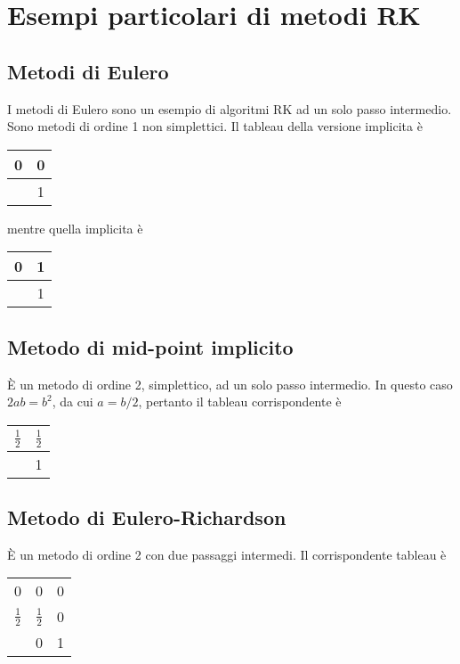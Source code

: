 \section{Esempi particolari di metodi RK}

\subsection{Metodi di Eulero}
I metodi di Eulero sono un esempio di algoritmi RK ad un solo passo intermedio. Sono metodi di ordine 1 non simplettici. Il tableau della versione implicita è
\begin{center}
\begin{tabular}{c|c}
0 & 0 \\
\midrule
 & 1 \\
\end{tabular}
\end{center}
mentre quella implicita è
\begin{center}
\begin{tabular}{c|c}
0 & 1 \\
\midrule
 & 1 \\
\end{tabular}
\end{center}

\subsection{Metodo di mid-point implicito}
È un metodo di ordine 2, simplettico, ad un solo passo intermedio. In questo caso $2ab = b^2$, da cui $a = b/2$, pertanto il tableau corrispondente è
\begin{center}
\begin{tabular}{c|c}
$\frac{1}{2}$ & $\frac{1}{2}$ \\
\midrule
 & 1 \\
\end{tabular}
\end{center}

\subsection{Metodo di Eulero-Richardson}
È un metodo di ordine 2 con due passaggi intermedi. Il corrispondente tableau è
\begin{center}
\begin{tabular}{c|cc}
0 & 0 & 0 \\
$\frac{1}{2}$ & $\frac{1}{2}$ & 0 \\
\midrule
 & 0 & 1 \\
\end{tabular}
\end{center}

